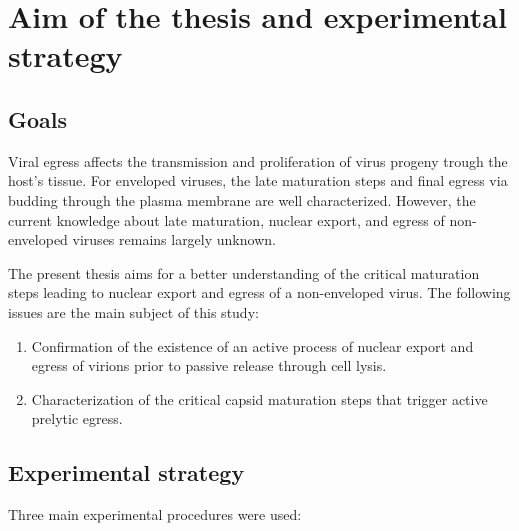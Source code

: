 
\chapter{Aim of the thesis and experimental strategy} %

\label{Aim} 


\graphicspath{{./Pictures/}}


\section{Goals}

Viral egress affects the transmission and proliferation of virus progeny trough the host's tissue. For enveloped viruses, the late maturation steps and final egress via budding through the plasma membrane are well characterized. However, the current knowledge about late maturation, nuclear export, and egress of non-enveloped viruses remains largely unknown. 

The present thesis aims for a better understanding of the critical maturation steps leading to nuclear export and egress of a non-enveloped virus. The following issues are the main subject of this study: 




\medskip

\begin{enumerate}
\item Confirmation of the existence of an active process of nuclear export and egress of virions prior to passive release through cell lysis. 
\item Characterization of the critical capsid maturation steps that trigger active prelytic egress.
\end{enumerate}

\bigskip
\bigskip

\section{Experimental strategy}

Three main experimental procedures were used:

\medskip

